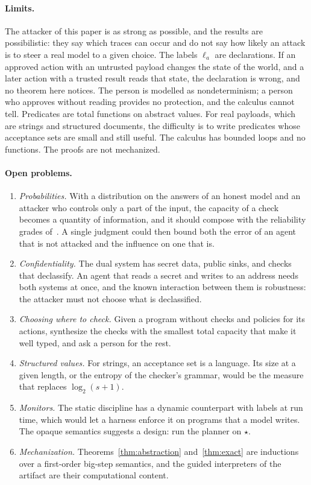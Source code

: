 \documentclass[acmsmall,nonacm,screen]{acmart}
\newcommand{\op}{\star}
\begin{document}
\paragraph{Limits.} The attacker of this paper is as strong as possible, and the results
are possibilistic: they say which traces can occur and do not say how likely an attack is to
steer a real model to a given choice. The labels $\ell_a$ are declarations. If an approved
action with an untrusted payload changes the state of the world, and a later action with a
trusted result reads that state, the declaration is wrong, and no theorem here notices. The
person is modelled as nondeterminism; a person who approves without reading provides no
protection, and the calculus cannot tell. Predicates are total functions on abstract values.
For real payloads, which are strings and structured documents, the difficulty is to write
predicates whose acceptance sets are small and still useful. The calculus has bounded loops
and no functions. The proofs are not mechanized.

\paragraph{Open problems.}
\begin{enumerate}
\item \emph{Probabilities.} With a distribution on the answers of an honest model and an
attacker who controls only a part of the input, the capacity of a check becomes a quantity
of information, and it should compose with the reliability grades of~\cite{tpp3}. A single
judgment could then bound both the error of an agent that is not attacked and the influence
on one that is.
\item \emph{Confidentiality.} The dual system has secret data, public sinks, and checks that
declassify. An agent that reads a secret and writes to an address needs both systems at
once, and the known interaction between them is robustness: the attacker must not choose
what is declassified.
\item \emph{Choosing where to check.} Given a program without checks and policies for its
actions, synthesize the checks with the smallest total capacity that make it well typed, and
ask a person for the rest.
\item \emph{Structured values.} For strings, an acceptance set is a language. Its size at a
given length, or the entropy of the checker's grammar, would be the measure that replaces
$\log_2(s+1)$.
\item \emph{Monitors.} The static discipline has a dynamic counterpart with labels at run
time, which would let a harness enforce it on programs that a model writes. The opaque
semantics suggests a design: run the planner on $\op$.
\item \emph{Mechanization.} Theorems~\ref{thm:abstraction} and~\ref{thm:exact} are
inductions over a first-order big-step semantics, and the guided interpreters of the
artifact are their computational content.
\end{enumerate}
\end{document}

